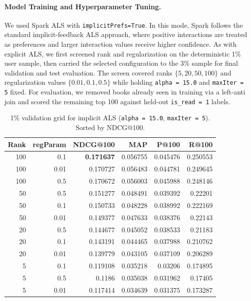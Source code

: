 \documentclass[10pt,twocolumn]{article}
\begin{document}
\paragraph{Model Training and Hyperparameter Tuning.} We used Spark ALS with \texttt{implicitPrefs=True}. In this mode, Spark follows the standard implicit-feedback ALS approach, where positive interactions are treated as preferences and larger interaction values receive higher confidence. As with explicit ALS, we first screened rank and regularization on the deterministic 1\% user sample, then carried the selected configuration to the 3\% sample for final validation and test evaluation. The screen covered ranks $\{5, 20, 50, 100\}$ and regularization values $\{0.01, 0.1, 0.5\}$ while holding \texttt{alpha = 15.0} and \texttt{maxIter = 5} fixed. For evaluation, we removed books already seen in training via a left-anti join and scored the remaining top 100 against held-out \texttt{is\_read = 1} labels.

\begin{table}[!ht]
\centering
\caption{1\% validation grid for implicit ALS (\texttt{alpha = 15.0}, \texttt{maxIter = 5}). Sorted by NDCG@100.}
\label{tab:implicit-grid}
\footnotesize
\setlength{\tabcolsep}{3pt}
\begin{tabular}{r r r r r r}
\toprule
\textbf{Rank} & \textbf{regParam} & \textbf{NDCG@100} & \textbf{MAP} & \textbf{P@100} & \textbf{R@100} \\
\midrule
100 & 0.1  & \textbf{0.171637} & 0.056755 & 0.045476 & 0.250553 \\
100 & 0.01 & 0.170727 & 0.056483 & 0.044781 & 0.249645 \\
100 & 0.5  & 0.170672 & 0.056003 & 0.045988 & 0.248146 \\
50  & 0.5  & 0.151277 & 0.048491 & 0.039392 & 0.22201 \\
50  & 0.1  & 0.150733 & 0.048228 & 0.038992 & 0.222169 \\
50  & 0.01 & 0.149377 & 0.047633 & 0.038376 & 0.22143 \\
20  & 0.5  & 0.144677 & 0.045052 & 0.038533 & 0.21183 \\
20  & 0.1  & 0.143191 & 0.044465 & 0.037988 & 0.210762 \\
20  & 0.01 & 0.139779 & 0.043105 & 0.037109 & 0.206289 \\
5   & 0.1  & 0.119108 & 0.035218 & 0.03206 & 0.174895 \\
5   & 0.5  & 0.1186 & 0.035038 & 0.031962 & 0.17405 \\
5   & 0.01 & 0.117414 & 0.034639 & 0.031375 & 0.173287 \\
\bottomrule
\end{tabular}
\end{table}
\end{document}
